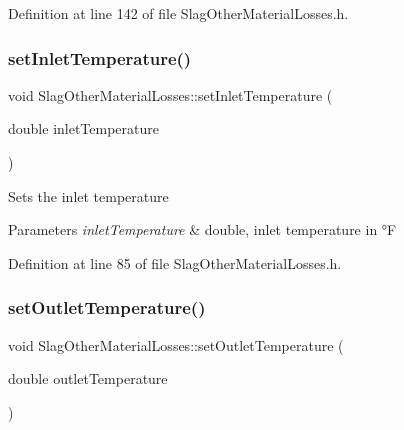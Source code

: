 Definition at line 142 of file Slag\+Other\+Material\+Losses.\+h.

\mbox{\label{class_slag_other_material_losses_a47bb0a61de501e3e9b7bd2bf2651eb8c}} 
\subsubsection{\texorpdfstring{set\+Inlet\+Temperature()}{setInletTemperature()}}
{\footnotesize\ttfamily void Slag\+Other\+Material\+Losses\+::set\+Inlet\+Temperature (\begin{DoxyParamCaption}\item[{double}]{inlet\+Temperature }\end{DoxyParamCaption})\hspace{0.3cm}{\ttfamily [inline]}}

Sets the inlet temperature 
\begin{DoxyParams}{Parameters}
{\em inlet\+Temperature} & double, inlet temperature in °F \\
\hline
\end{DoxyParams}


Definition at line 85 of file Slag\+Other\+Material\+Losses.\+h.

\mbox{\label{class_slag_other_material_losses_afae6aafff94d02926135fabf20a87070}} 
\subsubsection{\texorpdfstring{set\+Outlet\+Temperature()}{setOutletTemperature()}}
{\footnotesize\ttfamily void Slag\+Other\+Material\+Losses\+::set\+Outlet\+Temperature (\begin{DoxyParamCaption}\item[{double}]{outlet\+Temperature }\end{DoxyParamCaption})\hspace{0.3cm}{\ttfamily [inline]}}

